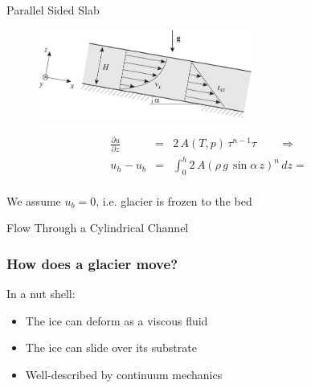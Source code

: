 \documentclass[hide notes,intlimits]{beamer}
\begin{document}
\begin{frame}{Parallel Sided Slab}
  \begin{figure}
    \includegraphics[width=7cm]{figures/fig_3_11}
  \end{figure}
  \begin{equation*}
    \begin{array}{ccl}
      \frac{\partial u}{\partial z}  & = &  2\,A(T,p)\,\tau^{n-1}\tau \qquad \Rightarrow \\[1em]
      u_{h} - u_{b} &  = & \int_{0}^{h} 2\,A\left(\rho\,g\,\sin{\alpha}\,z\right)^{n}\,dz =
    \end{array}
  \end{equation*}
  \\[.75em]
  We assume $u_b=0$, i.e. glacier is frozen to the bed
\end{frame}

\begin{frame}{Flow Through a Cylindrical Channel}

\end{frame}

\begin{frame}
  \frametitle{How does a glacier move?}
  \begin{block}{In a nut shell:}
    \begin{itemize}
    \item The ice can deform as a viscous fluid
    \item The ice can slide over its substrate
    \item Well-described by continuum mechanics
    \end{itemize}
  \end{block}
\end{frame}
\end{document}
